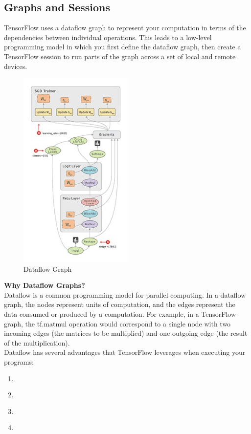 \subsection{Graphs and Sessions}
TensorFlow uses a dataflow graph to represent your computation in terms of the dependencies between individual operations. This leads to a low-level programming model in which you first define the dataflow graph, then create a TensorFlow session to run parts of the graph across a set of local and remote devices.\\
\begin{figure}[H]%
    \center%
    \includegraphics[width=0.5\textwidth]{images/eman/Dataflow-graph.jpg}%
\caption[This is Dataflow Graph]{Dataflow Graph}\label{fig:graph}%
  \end{figure}
  
  \textbf{Why Dataflow Graphs?}\\
Dataflow is a common programming model for parallel computing. In a dataflow graph, the nodes represent units of computation, and the edges represent the data consumed or produced by a computation. For example, in a TensorFlow graph, the tf.matmul operation would correspond to a single node with two incoming edges (the matrices to be multiplied) and one outgoing edge (the result of the multiplication).\\
Dataflow has several advantages that TensorFlow leverages when executing your programs:
\begin{enumerate}
      \item\textcite{Parallelism.}
\item\textcite{Distributed execution.}
\item\textcite{Compilation.}
\item\textcite{Portability.}
\end{enumerate}

